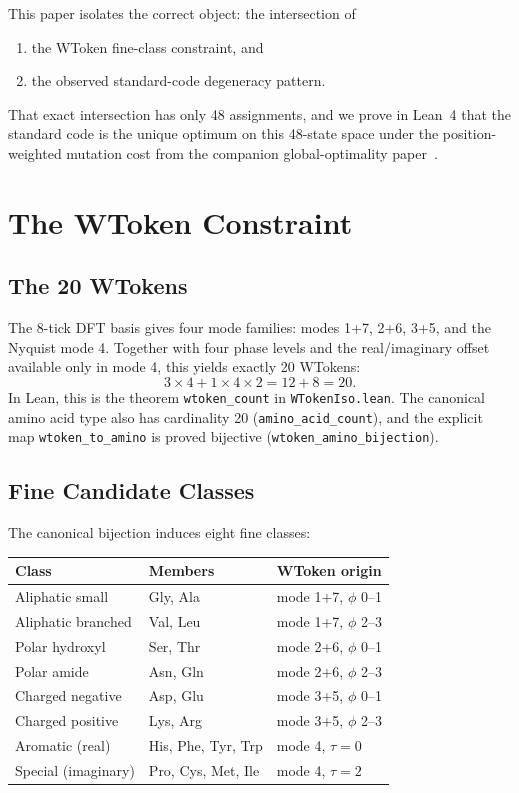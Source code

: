 \documentclass[11pt,twocolumn]{article}
\begin{document}
This paper isolates the correct object: the intersection of
\begin{enumerate}
\item the WToken fine-class constraint, and
\item the observed standard-code degeneracy pattern.
\end{enumerate}
That exact intersection has only 48 assignments, and we prove in Lean~4
that the standard code is the unique optimum on this 48-state space under
the position-weighted mutation cost from the companion global-optimality
paper~\cite{Paper2}.

\section{The WToken Constraint}

\subsection{The 20 WTokens}

The 8-tick DFT basis gives four mode families: modes 1+7, 2+6, 3+5, and
the Nyquist mode 4. Together with four phase levels and the real/imaginary
offset available only in mode 4, this yields exactly 20 WTokens:
\[
3 \times 4 + 1 \times 4 \times 2 = 12 + 8 = 20.
\]
In Lean, this is the theorem \texttt{wtoken\_count} in
\texttt{WTokenIso.lean}. The canonical amino acid type also has cardinality
20 (\texttt{amino\_acid\_count}), and the explicit map
\texttt{wtoken\_to\_amino} is proved bijective
(\texttt{wtoken\_amino\_bijection}).

\subsection{Fine Candidate Classes}

The canonical bijection induces eight fine classes:

\begin{center}
\small
\begin{tabular}{@{}lll@{}}
\toprule
Class & Members & WToken origin \\
\midrule
Aliphatic small & Gly, Ala & mode 1+7, $\phi$ 0--1 \\
Aliphatic branched & Val, Leu & mode 1+7, $\phi$ 2--3 \\
Polar hydroxyl & Ser, Thr & mode 2+6, $\phi$ 0--1 \\
Polar amide & Asn, Gln & mode 2+6, $\phi$ 2--3 \\
Charged negative & Asp, Glu & mode 3+5, $\phi$ 0--1 \\
Charged positive & Lys, Arg & mode 3+5, $\phi$ 2--3 \\
Aromatic (real) & His, Phe, Tyr, Trp & mode 4, $\tau = 0$ \\
Special (imaginary) & Pro, Cys, Met, Ile & mode 4, $\tau = 2$ \\
\bottomrule
\end{tabular}
\end{center}
\end{document}

